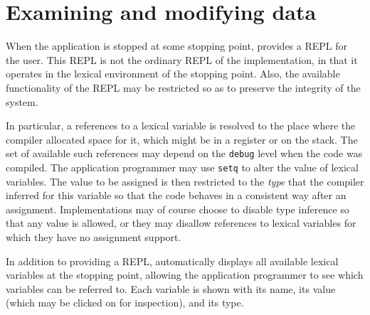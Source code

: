 \chapter{Examining and modifying data}

When the application is stopped at some stopping point, \sysname{}
provides a REPL for the user.  This REPL is not the ordinary REPL of
the \commonlisp{} implementation, in that it operates in the lexical
environment of the stopping point.  Also, the available functionality
of the REPL may be restricted so as to preserve the integrity of the
system.

In particular, a references to a lexical variable is resolved to the
place where the compiler allocated space for it, which might be in a
register or on the stack.  The set of available such references may
depend on the \texttt{debug} level when the code was compiled.  The
application programmer may use \texttt{setq} to alter the value of
lexical variables.  The value to be assigned is then restricted to the
\emph{type} that the compiler inferred for this variable so that the
code behaves in a consistent way after an assignment.  Implementations
may of course choose to disable type inference so that any value is
allowed, or they may disallow references to lexical variables for
which they have no \sysname{} assignment support.

In addition to providing a REPL, \sysname{} automatically displays all
available lexical variables at the stopping point, allowing the
application programmer to see which variables can be referred to.
Each variable is shown with its name, its value (which may be clicked
on for inspection), and its type.
